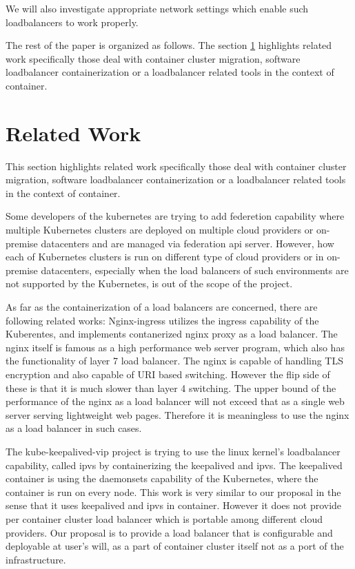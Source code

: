 We will also investigate appropriate network settings which enable such loadbalancers to work properly.

The rest of the paper is organized as follows.
The section \ref{Related Work} highlights related work specifically those deal with container cluster migration, 
software loadbalancer containerization or a loadbalancer related tools in the context of container. 

\section{Related Work}\label{Related Work}
This section highlights related work specifically those deal with container cluster migration, 
software loadbalancer containerization or a loadbalancer related tools in the context of container. 

Some developers of the kubernetes are trying to add federetion\cite{K8sFederation2017} capability 
where multiple Kubernetes clusters are deployed on multiple cloud providers or on-premise datacenters 
and are managed via federation api server. However, how each of Kubernetes clusters is run on different type of cloud providers
or in on-premise datacenters, especially when the load balancers of such environments are not supported by the Kubernetes, 
is out of the scope of the project. 
   
As far as the containerization of a load balancers are concerned, there are following related works:
Nginx-ingress\cite{Pleshakov2016,NginxInc2016} utilizes the ingress\cite{K8sIngress2017} capability of the Kuberentes, 
and implements contanerized nginx proxy as a load balancer. The nginx itself is famous as a high performance web server program,
which also has the functionality of layer 7 load balancer. The nginx is capable of handling TLS encryption and also capable of  
URI based switching. However the flip side of these is that it is much slower than layer 4 switching.
The upper bound of the performance of the nginx as a load balancer will not exceed that as a single web server serving lightweight web pages. 
Therefore it is meaningless to use the nginx as a load balancer in such cases.
 
The kube-keepalived-vip\cite{Prashanth2016} project is trying to use the linux kernel's loadbalancer capability, 
called ipvs\cite{Zhang2000} by containerizing the keepalived\cite{ACassen2016} and ipvs. 
The keepalived container is using the daemonsets\cite{K8sDaemonsets2017} capability of the Kubernetes, 
where the container is run on every node.
This work is very similar to our proposal in the sense that it uses keepalived and ipvs in container. However it does not provide 
per container cluster load balancer which is portable among different cloud providers.   
Our proposal is to provide a load balancer that is configurable and deployable at user's will,
 as a part of container cluster itself not as a port of the infrastructure.  

